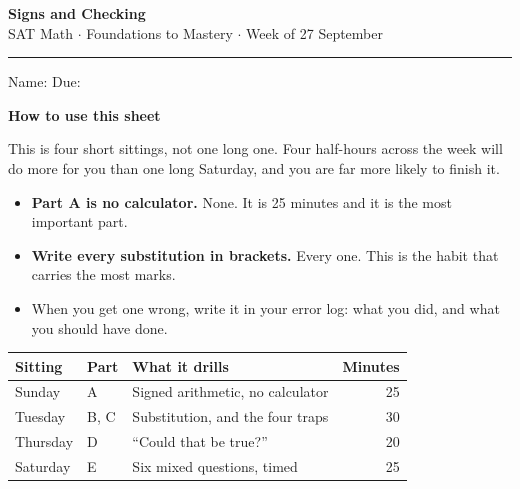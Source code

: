 \documentclass[11pt,a4paper]{article}
\newif\ifANSWERS
\begin{document}
\label{firstpage}

\begin{center}
{\LARGE\bfseries\color{navy}Signs and Checking}\\[4pt]
{\color{navy}SAT Math $\cdot$ Foundations to Mastery $\cdot$ Week of 27 September}
\ifANSWERS\\[4pt]{\color{keyred}\bfseries ANSWER KEY --- tutor copy}\fi
\end{center}
\vspace{2pt}
{\color{rule}\rule{\textwidth}{1pt}}
\vspace{6pt}

\ifANSWERS\else
Name: \underline{\hspace{6cm}} \hfill Due: \underline{\hspace{3.2cm}}
\vspace{6pt}
\fi

\begin{mdframed}[backgroundcolor=boxbg,linecolor=navy,linewidth=0.6pt,innertopmargin=6pt,innerbottommargin=8pt]
{\bfseries\color{navy}How to use this sheet}\par\vspace{2pt}
This is four short sittings, not one long one. Four half-hours across the week will
do more for you than one long Saturday, and you are far more likely to finish it.

\begin{itemize}[leftmargin=14pt,itemsep=1pt,topsep=3pt]
  \item \textbf{Part A is no calculator.} None. It is 25 minutes and it is the most important part.
  \item \textbf{Write every substitution in brackets.} Every one. This is the habit that carries the most marks.
  \item When you get one wrong, write it in your error log: what you did, and what you should have done.
\end{itemize}
\end{mdframed}

\vspace{4pt}
\begin{center}
\begin{tabularx}{\textwidth}{@{}l l X r@{}}
\textbf{Sitting} & \textbf{Part} & \textbf{What it drills} & \textbf{Minutes}\\[2pt]
\hline\rule{0pt}{11pt}
Sunday   & A    & Signed arithmetic, no calculator            & 25\\
Tuesday  & B, C & Substitution, and the four traps            & 30\\
Thursday & D    & ``Could that be true?''                     & 20\\
Saturday & E    & Six mixed questions, timed                  & 25\\
\hline
\end{tabularx}
\end{center}
\end{document}
